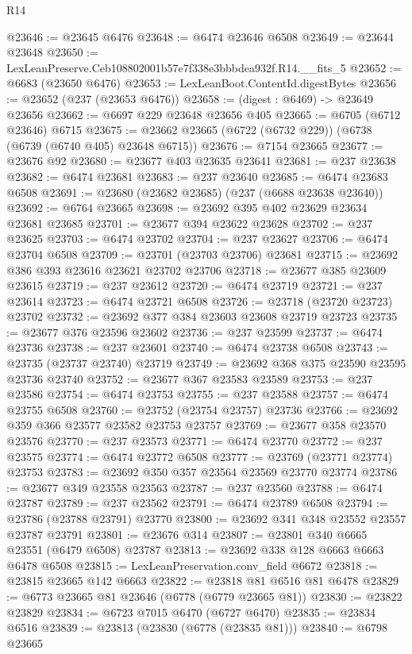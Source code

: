 \begin{lexlean}{R14}
\begin{coremodule}
@23646 := @23645 @6476
@23648 := @6474 @23646 @6508
@23649 := @23644 @23648
@23650 := LexLeanPreserve.Ceb108802001b57e7f338e3bbbdea932f.R14.__fits_5
@23652 := @6683 (@23650 @6476)
@23653 := LexLeanBoot.ContentId.digestBytes
@23656 := @23652 (@237 (@23653 @6476))
@23658 := (digest : @6469) -> @23649 @23656
@23662 := @6697 @229 @23648 @23656 @405
@23665 := @6705 (@6712 @23646) @6715
@23675 := @23662 @23665 (@6722 (@6732 @229)) (@6738 (@6739 (@6740 @405) @23648 @6715))
@23676 := @7154 @23665
@23677 := @23676 @92
@23680 := @23677 @403 @23635 @23641
@23681 := @237 @23638
@23682 := @6474 @23681
@23683 := @237 @23640
@23685 := @6474 @23683 @6508
@23691 := @23680 (@23682 @23685) (@237 (@6688 @23638 @23640))
@23692 := @6764 @23665
@23698 := @23692 @395 @402 @23629 @23634 @23681 @23685
@23701 := @23677 @394 @23622 @23628
@23702 := @237 @23625
@23703 := @6474 @23702
@23704 := @237 @23627
@23706 := @6474 @23704 @6508
@23709 := @23701 (@23703 @23706) @23681
@23715 := @23692 @386 @393 @23616 @23621 @23702 @23706
@23718 := @23677 @385 @23609 @23615
@23719 := @237 @23612
@23720 := @6474 @23719
@23721 := @237 @23614
@23723 := @6474 @23721 @6508
@23726 := @23718 (@23720 @23723) @23702
@23732 := @23692 @377 @384 @23603 @23608 @23719 @23723
@23735 := @23677 @376 @23596 @23602
@23736 := @237 @23599
@23737 := @6474 @23736
@23738 := @237 @23601
@23740 := @6474 @23738 @6508
@23743 := @23735 (@23737 @23740) @23719
@23749 := @23692 @368 @375 @23590 @23595 @23736 @23740
@23752 := @23677 @367 @23583 @23589
@23753 := @237 @23586
@23754 := @6474 @23753
@23755 := @237 @23588
@23757 := @6474 @23755 @6508
@23760 := @23752 (@23754 @23757) @23736
@23766 := @23692 @359 @366 @23577 @23582 @23753 @23757
@23769 := @23677 @358 @23570 @23576
@23770 := @237 @23573
@23771 := @6474 @23770
@23772 := @237 @23575
@23774 := @6474 @23772 @6508
@23777 := @23769 (@23771 @23774) @23753
@23783 := @23692 @350 @357 @23564 @23569 @23770 @23774
@23786 := @23677 @349 @23558 @23563
@23787 := @237 @23560
@23788 := @6474 @23787
@23789 := @237 @23562
@23791 := @6474 @23789 @6508
@23794 := @23786 (@23788 @23791) @23770
@23800 := @23692 @341 @348 @23552 @23557 @23787 @23791
@23801 := @23676 @314
@23807 := @23801 @340 @6665 @23551 (@6479 @6508) @23787
@23813 := @23692 @338 @128 @6663 @6663 @6478 @6508
@23815 := LexLeanPreservation.conv_field @6672
@23818 := @23815 @23665 @142 @6663
@23822 := @23818 @81 @6516 @81 @6478
@23829 := @6773 @23665 @81 @23646 (@6778 (@6779 @23665 @81))
@23830 := @23822 @23829
@23834 := @6723 @7015 @6470 (@6727 @6470)
@23835 := @23834 @6516
@23839 := @23813 (@23830 (@6778 (@23835 @81)))
@23840 := @6798 @23665

\end{coremodule}
\end{lexlean}
